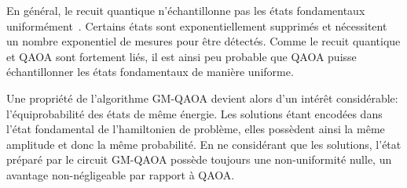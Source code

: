 En général, le recuit quantique n'échantillonne pas les états fondamentaux uniformément~\cite{matsudaGroundstateStatisticsAnnealing2009, mandraExponentiallyBiasedGroundState2017}. Certains états sont exponentiellement supprimés et nécessitent un nombre exponentiel de mesures pour être détectés. Comme le recuit quantique et QAOA sont fortement liés, il est ainsi peu probable que QAOA puisse échantillonner les états fondamentaux de manière uniforme.

Une propriété de l'algorithme GM-QAOA devient alors d'un intérêt considérable: l'équiprobabilité des états de même énergie. Les solutions étant encodées dans l'état fondamental de l'hamiltonien de problème, elles possèdent ainsi la même amplitude et donc la même probabilité. En ne considérant que les solutions, l'état préparé par le circuit GM-QAOA possède toujours une non-uniformité nulle, un avantage non-négligeable par rapport à QAOA.
